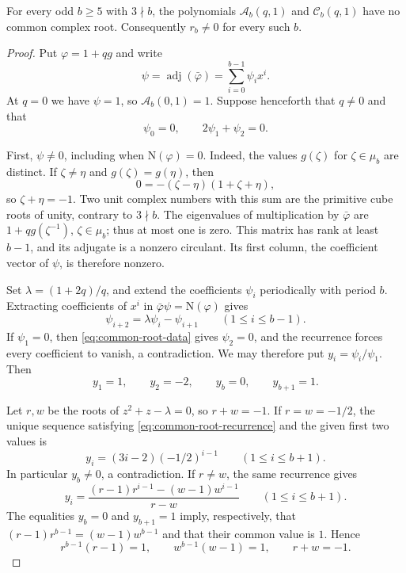 \documentclass[12pt]{article}
\newcommand{\adj}{\operatorname{adj}}
\newcommand{\Nm}{\mathrm{N}}
\newcommand{\gpoly}{g}
\begin{document}
\begin{theorem}\label{thm:base-coprime}
For every odd $b\ge5$ with $3\nmid b$, the polynomials
$\mathcal A_b(q,1)$ and $\mathcal C_b(q,1)$ have no common complex root.
Consequently $r_b\ne0$ for every such $b$.
\end{theorem}
\begin{proof}
Put $\varphi=1+q\gpoly$ and write
\[
 \psi=\adj(\bar\varphi)=\sum_{i=0}^{b-1}\psi_i x^i.
\]
At $q=0$ we have $\psi=1$, so $\mathcal A_b(0,1)=1$.
Suppose henceforth that $q\ne0$ and that
\begin{equation}\label{eq:common-root-data}
 \psi_0=0,\qquad 2\psi_1+\psi_2=0.
\end{equation}

First, $\psi\ne0$, including when $\Nm(\varphi)=0$.
Indeed, the values $\gpoly(\zeta)$ for $\zeta\in\mu_b$ are distinct.
If $\zeta\ne\eta$ and $\gpoly(\zeta)=\gpoly(\eta)$, then
\[
 0=-(\zeta-\eta)(1+\zeta+\eta),
\]
so $\zeta+\eta=-1$. Two unit complex numbers with this sum are the
primitive cube roots of unity, contrary to $3\nmid b$.
The eigenvalues of multiplication by $\bar\varphi$ are
$1+q\gpoly(\zeta^{-1})$, $\zeta\in\mu_b$; thus at most one is zero.
This matrix has rank at least $b-1$, and its adjugate is a nonzero
circulant. Its first column, the coefficient vector of $\psi$, is
therefore nonzero.

Set $\lambda=(1+2q)/q$, and extend the coefficients $\psi_i$
periodically with period $b$. Extracting coefficients of $x^i$ in
$\bar\varphi\psi=\Nm(\varphi)$ gives
\begin{equation}\label{eq:common-root-recurrence}
 \psi_{i+2}=\lambda\psi_i-\psi_{i+1}
 \qquad(1\le i\le b-1).
\end{equation}
If $\psi_1=0$, then \eqref{eq:common-root-data} gives $\psi_2=0$,
and the recurrence forces every coefficient to vanish, a
contradiction. We may therefore put $y_i=\psi_i/\psi_1$. Then
\[
 y_1=1,\qquad y_2=-2,\qquad y_b=0,\qquad y_{b+1}=1.
\]

Let $r,w$ be the roots of $z^2+z-\lambda=0$, so $r+w=-1$.
If $r=w=-1/2$, the unique sequence satisfying
\eqref{eq:common-root-recurrence} and the given first two values is
\[
 y_i=(3i-2)(-1/2)^{i-1}\qquad(1\le i\le b+1).
\]
In particular $y_b\ne0$, a contradiction. If $r\ne w$, the same
recurrence gives
\[
 y_i=\frac{(r-1)r^{i-1}-(w-1)w^{i-1}}{r-w}
 \qquad(1\le i\le b+1).
\]
The equalities $y_b=0$ and $y_{b+1}=1$ imply, respectively, that
$(r-1)r^{b-1}=(w-1)w^{b-1}$ and that their common value is $1$.
Hence
\begin{equation}\label{eq:common-root-units}
 r^{b-1}(r-1)=1,\qquad w^{b-1}(w-1)=1,\qquad r+w=-1.
\end{equation}


\end{proof}
\end{document}
